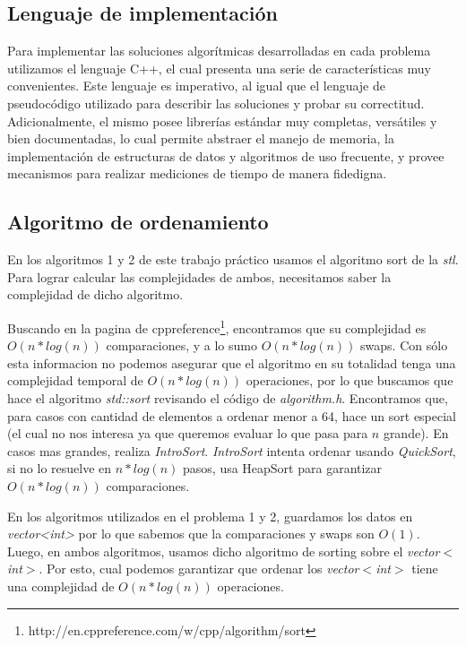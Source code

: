 \subsection{Lenguaje de implementación}

Para implementar las soluciones algorítmicas desarrolladas en cada problema utilizamos el lenguaje C++, el cual presenta una serie de características muy convenientes. Este lenguaje es imperativo, al igual que el lenguaje de pseudocódigo utilizado para describir las soluciones y probar su correctitud. Adicionalmente, el mismo posee librerías estándar muy completas, versátiles y bien documentadas, lo cual permite abstraer el manejo de memoria, la implementación de estructuras de datos y algoritmos de uso frecuente, y provee mecanismos para realizar mediciones de tiempo de manera fidedigna.

\subsection{Algoritmo de ordenamiento}

En los algoritmos 1 y 2 de este trabajo práctico usamos el algoritmo sort de la \emph{stl}. Para lograr calcular las complejidades de ambos, necesitamos saber la complejidad de dicho algoritmo.

Buscando en la pagina de cppreference\footnote{http://en.cppreference.com/w/cpp/algorithm/sort}, encontramos que su complejidad es $O(n*log (n))$  comparaciones, y a lo sumo $O(n*log (n))$ swaps. Con sólo esta informacion no podemos asegurar que el algoritmo en su totalidad tenga una complejidad temporal de $O(n*log (n))$  operaciones, por lo que buscamos que hace el algoritmo \emph{std::sort} revisando el código de \emph{algorithm.h}. Encontramos que, para casos con cantidad de elementos a ordenar menor a 64, hace un sort especial (el cual no nos interesa ya que queremos evaluar lo que pasa para $n$ grande). En casos mas grandes, realiza \emph{IntroSort}. \emph{IntroSort} intenta ordenar usando \emph{QuickSort}, si no lo resuelve en $n*log (n)$ pasos, usa HeapSort para garantizar $O(n*log (n))$ comparaciones.

En los algoritmos utilizados en el problema 1 y 2, guardamos los datos en \emph{vector<int>} por lo que sabemos que la comparaciones y swaps son $O(1)$. Luego, en ambos algoritmos, usamos dicho algoritmo de sorting sobre el  \emph{vector$<$int$>$}. Por esto, cual podemos garantizar que ordenar los \emph{vector$<$int$>$} tiene una complejidad de $O(n*log (n))$ operaciones.

